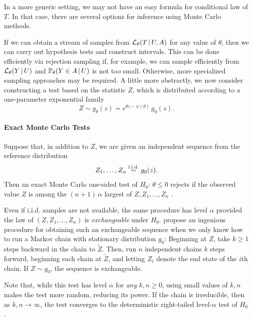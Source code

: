 \documentclass{article}
\theoremstyle{definition}
\newcommand{\cL}{\mathcal{L}}
\begin{document}
In a more generic setting, we may not have an easy formula for conditional law of $T$. In that case, there are several options for inference using Monte Carlo methods.

If we can obtain a stream of samples from $\cL_\theta(T\gv U, A)$ for any value of $\theta$, then we can carry out hypothesis tests and construct intervals. This can be done efficiently via rejection sampling if, for example, we can sample efficiently from $\cL_\theta(Y\gv U)$ and $\mathbb{P}_\theta(Y \in A \,|\, U)$ is not too small. Otherwise, more specialized sampling approaches may be required. A little more abstractly, we now consider constructing a test based on the statistic $Z$, which is distributed according to a one-parameter exponential family
\begin{equation}
  Z \sim g_\theta(z) = e^{\theta z - \psi(\theta)}\,g_0(z).
\end{equation}

\paragraph{Exact Monte Carlo Tests}
Suppose that, in addition to $Z$, we are given an independent sequence
from the reference distribution
\begin{equation}
  Z_1, \ldots, Z_n \overset{\textrm{i.i.d.}}{\sim} g_0(z).
\end{equation}
Then an exact Monte Carlo one-sided test of
$H_0:\,\theta \leq 0$ rejects if the observed value $Z$ is
among the $(n+1)\,\alpha$ largest of $Z,Z_1,\ldots,Z_n$ \citep{barnard1963discussion}.

Even if i.i.d. samples are not available, the same procedure has level $\alpha$ provided the law of $(Z,Z_1,\ldots,Z_n)$ is {\em exchangeable} under $H_0$. \citet{besag1989generalized} propose an ingenious procedure for obtaining such an exchangeable sequence when we only know how to run a Markov chain with stationary distribution $g_0$: Beginning at $Z$, take $k\geq 1$ steps backward in the chain to $\widetilde Z$. Then, run $n$ independent chains $k$ steps forward, beginning each chain at $\widetilde Z$, and letting $Z_i$ denote the end state of the $i$th chain. If $Z\sim g_0$, the sequence is exchangeable. 

Note that, while this test has level $\alpha$ for {\em any} $k, n \geq 0$, using small values of $k,n$ makes the test more random, reducing its power. If the chain is irreducible, then as $k,n\to \infty$, the test converges to the deterministic right-tailed level-$\alpha$ test of $H_0$.
\end{document}
